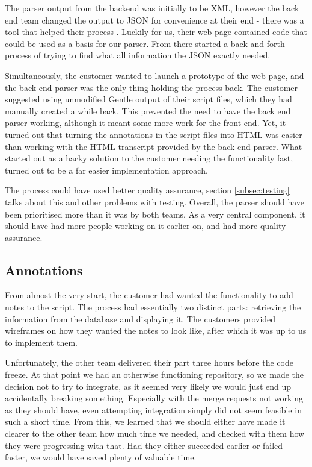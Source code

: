 \documentclass{l3proj}
\begin{document}
The parser output from the backend was initially to be XML, however the back end team changed the output to JSON for convenience at their end - there was a tool that helped their process \cite{gentle}. Luckily for us, their web page contained code that could be used as a basis for our parser.  From there started a back-and-forth process of trying to find what all information the JSON exactly needed. 

Simultaneously, the customer wanted to launch a prototype of the web page, and the back-end parser was the only thing holding the process back. The customer suggested using unmodified Gentle output of their script files, which they had manually created a while back. This prevented the need to have the back end parser working, although it meant some more work for the front end. Yet, it turned out that turning the annotations in the script files into HTML was easier than working with the HTML transcript provided by the back end parser. What started out as a hacky solution to the customer needing the functionality fast, turned out to be a far easier implementation approach.

The process could have used better quality assurance, section  \ref{subsec:testing} talks about this and other problems with testing. Overall, the parser should have been prioritised more than it was by both teams. As a very central component, it should have had more people working on it earlier on, and had more quality assurance.


\subsection{Annotations}
\label{subsec:annotations}
From almost the very start, the customer had wanted the functionality to add notes to the script. The process had essentially two distinct parts: retrieving the information from the database and displaying it.
The customers provided wireframes on how they wanted the notes to look like, after which it was up to us to implement them. 

Unfortunately, the other team delivered their part three hours before the code freeze. At that point we had an otherwise functioning repository, so we made the decision not to try to integrate, as it seemed very likely we would just end up accidentally breaking something. Especially with the merge requests not working as they should have, even attempting integration simply did not seem feasible in such a short time.
From this, we learned that we should either have made it clearer to the other team how much time we needed, and checked with them how they were progressing with that. Had they either succeeded earlier or failed faster, we would have saved plenty of valuable time.
\end{document}
